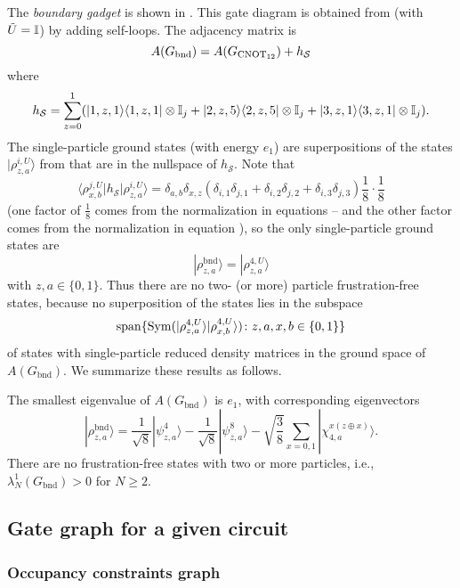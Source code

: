 \documentclass[../thesis-main/thesis-main]{subfiles}
\begin{document}
The \emph{boundary gadget} is shown in . This gate diagram is obtained from  (with $\tilde U=\mathbb{I}$) by adding self-loops. The adjacency matrix is
\[
  A(G_{\text{bnd}})=A(G_{\mathrm{CNOT}_{12}})+h_{\mathcal{S}}
\]
where 
\[
  h_{\mathcal{S}}
  =\sum_{z=0}^{1}(
    |1,z,1\rangle\langle1,z,1|\otimes\mathbb{I}_{j}
   +|2,z,5\rangle\langle2,z,5|\otimes\mathbb{I}_{j}
   +|3,z,1\rangle\langle3,z,1|\otimes\mathbb{I}_{j}
  ).
\]
The single-particle ground states (with energy $e_{1}$) are superpositions of the states $|\rho_{z,a}^{i,U}\rangle$ from  that are in the nullspace of $h_{\mathcal{S}}$. Note that 
\[
\langle\rho_{x,b}^{j,U}|h_{\mathcal{S}}|\rho_{z,a}^{i,U}\rangle=\delta_{a,b}\delta_{x,z}\left(\delta_{i,1}\delta_{j,1}+\delta_{i,2}\delta_{j,2}+\delta_{i,3}\delta_{j,3}\right)\frac{1}{8}\cdot\frac{1}{8}
\]
(one factor of $\frac{1}{8}$ comes from the normalization in equations -- and the other factor comes from the normalization in equation ), so the only single-particle ground states are 
\[
|\rho_{z,a}^{\text{bnd}}\rangle = |\rho_{z,a}^{4,U}\rangle
\]
with $z,a\in\{0,1\}$. Thus there are no two- (or more) particle frustration-free states, because no superposition of the states  lies in the subspace 
\[
\operatorname{span}\{ \operatorname{Sym}(|\rho_{z,a}^{4,U}\rangle|\rho_{x,b}^{4,U}\rangle)\colon z,a,x,b\in\{0,1\}\} 
\]
of states with single-particle reduced density matrices in the ground space of $A(G_{\text{bnd}})$.  We summarize these results as follows.

\begin{lemma}\label{lem:boundary_lemma}
The smallest eigenvalue of $A(G_{\text{bnd}})$ is $e_{1}$, with corresponding eigenvectors 
\begin{equation}
|\rho_{z,a}^{\text{bnd}}\rangle=\frac{1}{\sqrt{8}}|\psi_{z,a}^{4}\rangle-\frac{1}{\sqrt{8}}|\psi_{z,a}^{8}\rangle-\sqrt{\frac{3}{8}}\sum_{x=0,1}|\chi_{4,a}^{x\left(z\oplus x\right)}\rangle.\label{eq:rho_bnd}
\end{equation}
There are no frustration-free states with two or more particles, i.e., $\lambda_{N}^{1}(G_{\text{bnd}})>0$ for $N\geq2$.
\end{lemma}


\subsection{Gate graph for a given circuit}
\subsubsection{Occupancy constraints graph}
\end{document}
